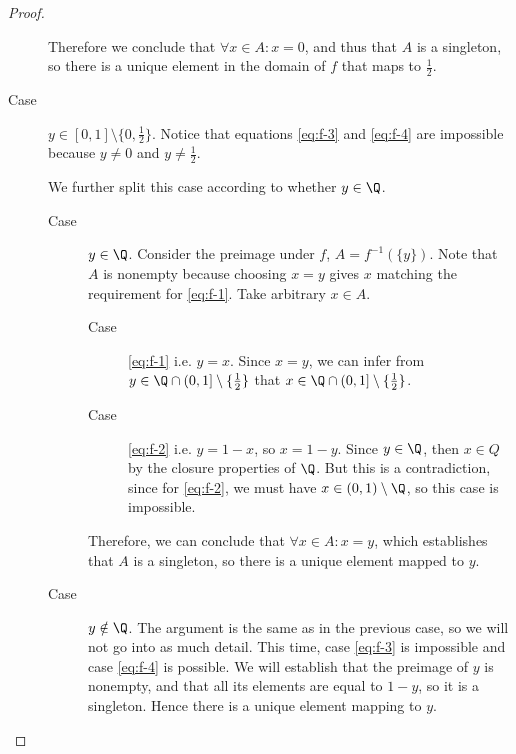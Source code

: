 \documentclass[letterpaper,11pt]{article}
\newcommand{\intersn}{\cap}
\newcommand{\half}{\frac{1}{2}}
\begin{document}
\begin{proof}
\begin{description}
            Therefore we conclude that $\forall x \in A: x = 0$, and thus that
            $A$ is a singleton, so there is a unique element in the domain of
            $f$ that maps to $\half$.

        \item[Case] $y \in [0, 1] \setminus \{0, \half\}$.
            Notice that equations \eqref{eq:f-3} and \eqref{eq:f-4} are
            impossible because $y \neq 0$ and $y \neq \half$.

            We further split this case according to whether $y \in \Q$.
            \begin{description}
                \item[Case] $y \in \Q$.
                    Consider the preimage under $f$,
                    $A = f^{-1}(\{y\})$.
                    Note that $A$ is nonempty because choosing $x = y$ gives
                    $x$ matching the requirement for \eqref{eq:f-1}.
                    Take arbitrary $x \in A$.
                    \begin{description}
                        \item[Case] \eqref{eq:f-1} i.e. $y = x$.
                            Since $x = y$, we can infer from
                            $y \in \Q \intersn (0, 1] \setminus \{\half\}$
                            that
                            $x \in \Q \intersn (0, 1] \setminus \{\half\}$.

                        \item[Case] \eqref{eq:f-2} i.e. $y = 1 - x$, so
                            $x = 1 - y$. Since $y \in \Q$, then $x \in Q$ by
                            the closure properties of $\Q$.
                            But this is a contradiction, since for
                            \eqref{eq:f-2}, we must have
                            $x \in (0, 1) \setminus \Q$, so this case is
                            impossible.
                    \end{description}
                    Therefore, we can conclude that $\forall x \in A: x = y$,
                    which establishes that $A$ is a singleton, so there is a
                    unique element mapped to $y$.
                \item[Case] $y \notin \Q$.
                    The argument is the same as in the previous case, so we
                    will not go into as much detail.
                    This time, case \eqref{eq:f-3} is impossible and
                    case \eqref{eq:f-4} is possible. We will establish that the
                    preimage of $y$ is nonempty, and that all its elements are
                    equal to $1 - y$, so it is a singleton. Hence there is a
                    unique element mapping to $y$.
            \end{description}
    \end{description}


\end{proof}
\end{document}

